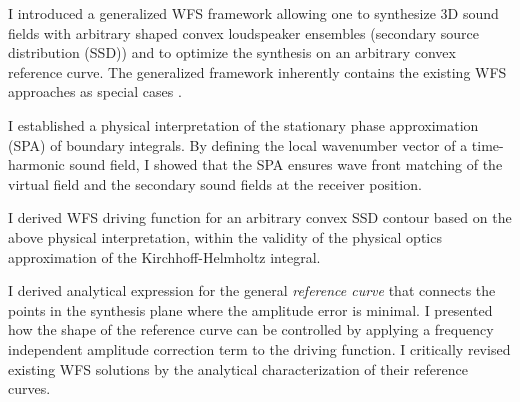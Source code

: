 \begin{thesisgroup}
I introduced a generalized WFS framework allowing one to synthesize 3D sound fields with arbitrary shaped convex loudspeaker ensembles (secondary source distribution (SSD)) and to optimize the synthesis on an arbitrary convex reference curve. 
The generalized framework inherently contains the existing WFS approaches as special cases \cite{Firtha2016}.
\begin{thesis}
I established a physical interpretation of the stationary phase approximation (SPA) of boundary integrals.
By defining the local wavenumber vector of a time-harmonic sound field, I showed that the SPA ensures wave front matching of the virtual field and the secondary sound fields at the receiver position.
\end{thesis}
\begin{thesis}
I derived WFS driving function for an arbitrary convex SSD contour based on the above physical interpretation, within the validity of the physical optics approximation of the Kirchhoff-Helmholtz integral.
\end{thesis}
\begin{thesis}
I derived analytical expression for the general \emph{reference curve} that connects the points in the synthesis plane where the amplitude error is minimal.
I presented how the shape of the reference curve can be controlled by applying a frequency independent amplitude correction term to the driving function.
I critically revised existing WFS solutions by the analytical characterization of their reference curves. 
\end{thesis}
\end{thesisgroup}

